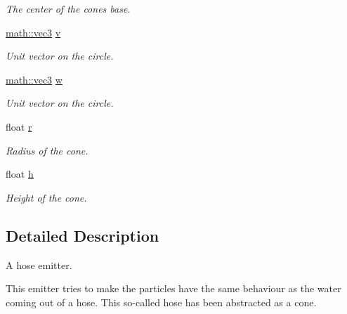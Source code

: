\begin{DoxyCompactItemize}
\begin{DoxyCompactList}\small\item\em The center of the cone\textquotesingle{}s base. \end{DoxyCompactList}\item 
\hyperlink{structphysim_1_1math_1_1vec3}{math\+::vec3} \hyperlink{classphysim_1_1emitters_1_1free__emitters_1_1hose_a3a849102db9771fe37143abec55f29f7}{v}
\begin{DoxyCompactList}\small\item\em Unit vector on the circle. \end{DoxyCompactList}\item 
\hyperlink{structphysim_1_1math_1_1vec3}{math\+::vec3} \hyperlink{classphysim_1_1emitters_1_1free__emitters_1_1hose_a2c408a7344d516cd74a57250e8d708e2}{w}
\begin{DoxyCompactList}\small\item\em Unit vector on the circle. \end{DoxyCompactList}\item 
\mbox{\label{classphysim_1_1emitters_1_1free__emitters_1_1hose_af89bf89e98c1670556734022e034f2aa}} 
float \hyperlink{classphysim_1_1emitters_1_1free__emitters_1_1hose_af89bf89e98c1670556734022e034f2aa}{r}
\begin{DoxyCompactList}\small\item\em Radius of the cone. \end{DoxyCompactList}\item 
\mbox{\label{classphysim_1_1emitters_1_1free__emitters_1_1hose_ac1398640d981dd745b8d26e72bc7fe40}} 
float \hyperlink{classphysim_1_1emitters_1_1free__emitters_1_1hose_ac1398640d981dd745b8d26e72bc7fe40}{h}
\begin{DoxyCompactList}\small\item\em Height of the cone. \end{DoxyCompactList}\end{DoxyCompactItemize}


\subsection{Detailed Description}
A hose emitter. 

This emitter tries to make the particles have the same behaviour as the water coming out of a hose. This so-\/called hose has been abstracted as a cone.

